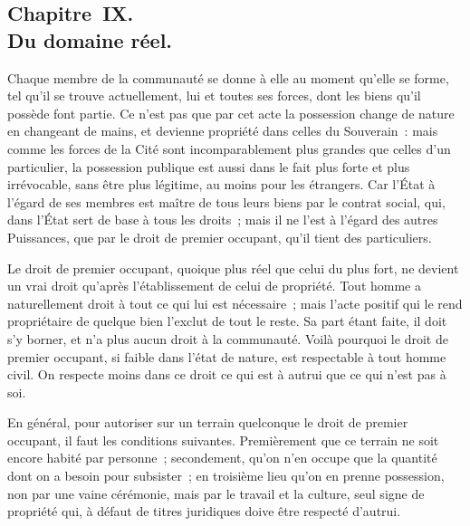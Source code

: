 \documentclass[french,twoside]{book} %
\begin{document}
\subsection[{Chapitre IX. Du domaine réel.}]{Chapitre IX. \\
Du domaine réel.}
\noindent Chaque membre de la communauté se donne à elle au moment qu’elle se forme, tel qu’il se trouve actuellement, lui et toutes ses forces, dont les biens qu’il possède font partie. Ce n’est pas que par cet acte la possession change de nature en changeant de mains, et devienne propriété dans celles du Souverain : mais comme les forces de la Cité sont incomparablement plus grandes que celles d’un particulier, la possession publique est aussi dans le fait plus forte et plus irrévocable, sans être plus légitime, au moins pour les étrangers. Car l’État à l’égard de ses membres est maître de tous leurs biens par le contrat social, qui, dans l’État sert de base à tous les droits ; mais il ne l’est à l’égard des autres Puissances, que par le droit de premier occupant, qu’il tient des particuliers.\par
Le droit de premier occupant, quoique plus réel que celui du plus fort, ne devient un vrai droit qu’après l’établissement de celui de propriété. Tout homme a naturellement droit à tout ce qui lui est nécessaire ; mais l’acte positif qui le rend propriétaire de quelque bien l’exclut de tout le reste. Sa part étant faite, il doit s’y borner, et n’a plus aucun droit à la communauté. Voilà pourquoi le droit de premier occupant, si faible dans l’état de nature, est respectable à tout homme civil. On respecte moins dans ce droit ce qui est à autrui que ce qui n’est pas à soi.\par
En général, pour autoriser sur un terrain quelconque le droit de premier occupant, il faut les conditions suivantes. Premièrement que ce terrain ne soit encore habité par personne ; secondement, qu’on n’en occupe que la quantité dont on a besoin pour subsister ; en troisième lieu qu’on en prenne possession, non par une vaine cérémonie, mais par le travail et la culture, seul signe de propriété qui, à défaut de titres juridiques doive être respecté d’autrui.\par
\end{document}
